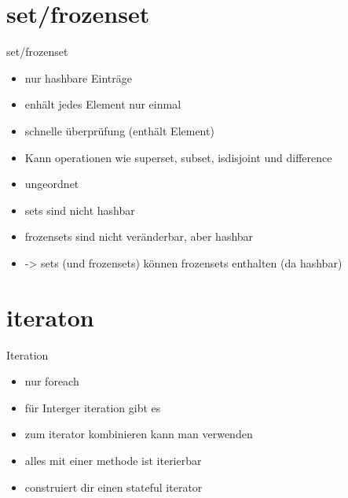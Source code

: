 \section{set/frozenset}
\begin{frame}{set/frozenset}
\begin{itemize}
	\item nur hashbare Einträge
	\item enhält jedes Element nur einmal
	\item schnelle  überprüfung (enthält Element)
	\item Kann operationen wie superset, subset, isdisjoint und difference 
	\item ungeordnet
	\item sets sind nicht hashbar
	\item frozensets sind nicht veränderbar, aber hashbar
	\item -> sets (und frozensets) können frozensets enthalten (da hashbar)
\end{itemize}
\end{frame}
\begin{frame}{}
	
\end{frame}

\section{iteraton}
\begin{frame}{Iteration}
\begin{itemize}
	\item nur foreach
	\item für Interger iteration gibt es 
	\item zum iterator kombinieren kann man  verwenden
	\item alles mit einer  methode ist iterierbar
	\item {} construiert dir einen stateful iterator
\end{itemize}
\end{frame}
\begin{frame}{}
	
\end{frame}
\begin{frame}
	
\end{frame}

